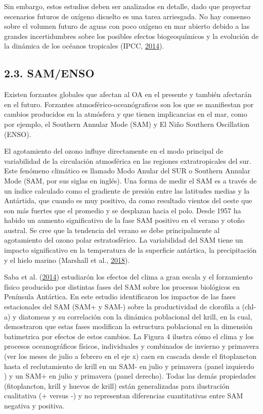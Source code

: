\documentclass[
]{article}
\begin{document}
Sin embargo, estos estudios deben ser analizados en detalle, dado que
proyectar escenarios futuros de oxígeno disuelto es una tarea
arriesgada. No hay consenso sobre el volumen futuro de aguas con poco
oxígeno en mar abierto debido a las grandes incertidumbres sobre los
posibles efectos biogeoquímicos y la evolución de la dinámica de los
océanos tropicales (IPCC, \protect\hyperlink{ref-IPCC2014}{2014}).

\hypertarget{samenso}{%
\subsection{2.3. SAM/ENSO}\label{samenso}}

Existen forzantes globales que afectan al OA en el presente y también
afectarán en el futuro. Forzantes atmosférico-oceanógraficos son los que
se manifiestan por cambios producidos en la atmósfera y que tienen
implicancias en el mar, como por ejemplo, el Southern Annular Mode (SAM)
y El Niño Southern Oscillation (ENSO).

El agotamiento del ozono influye directamente en el modo principal de
variabilidad de la circulación atmosférica en las regiones
extratropicales del sur. Este fenómeno climático es llamado Modo Anular
del SUR o Southern Annular Mode (SAM, por sus siglas en inglés). Una
forma de medir el SAM es a través de un índice calculado como el
gradiente de presión entre las latitudes medias y la Antártida, que
cuando es muy positivo, da como resultado vientos del oeste que son más
fuertes que el promedio y se desplazan hacia el polo. Desde 1957 ha
habido un aumento significativo de la fase SAM positivo en el verano y
otoño austral. Se cree que la tendencia del verano se debe
principalmente al agotamiento del ozono polar estratosférico. La
variabilidad del SAM tiene un impacto significativo en la temperatura de
la superficie antártica, la precipitación y el hielo marino (Marshall et
al., \protect\hyperlink{ref-Marshall2018}{2018}).

Saba et al. (\protect\hyperlink{ref-Saba2014}{2014}) estudiarón los
efectos del clima a gran escala y el forzamiento físico producido por
distintas fases del SAM sobre los procesos biológicos en Península
Antártica. En este estudio identificaron los impactos de las fases
estacionales del SAM (SAM+ y SAM-) sobre la productividad de clorofila a
(chl-a) y diatomeas y su correlación con la dinámica poblacional del
krill, en la cual, demostraron que estas fases modifican la estructura
poblacional en la dimensión batimetrica por efectos de estos cambios. La
Figura 4 ilustra cómo el clima y los procesos oceanográficos físicos,
individuales y combinados de invierno y primavera (ver los meses de
julio a febrero en el eje x) caen en cascada desde el fitoplancton hasta
el reclutamiento de krill en un SAM- en julio y primavera (panel
izquierdo ) y un SAM+ en julio y primavera (panel derecho). Todas las
demás propiedades (fitoplancton, krill y huevos de krill) están
generalizadas para ilustración cualitativa (+ versus -) y no representan
diferencias cuantitativas entre SAM negativa y positiva.
\end{document}
